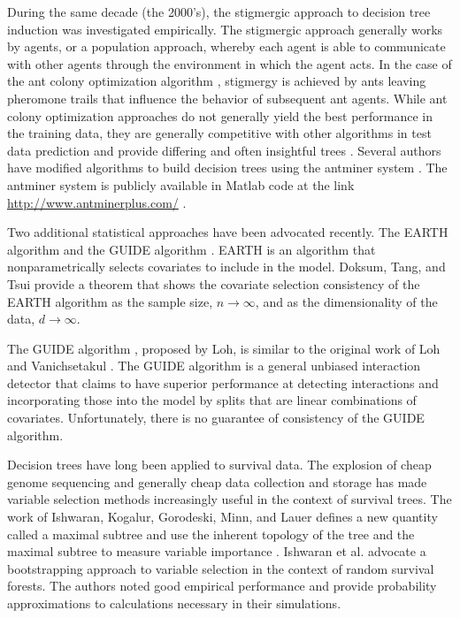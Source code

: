 During the same decade (the 2000's), the stigmergic approach to decision tree induction was investigated empirically. The stigmergic approach generally works by agents, or a population approach, whereby each agent is able to communicate with other agents through the environment in which the agent acts. In the case of the ant colony optimization algorithm \cite{dorigo2004ant}, stigmergy is achieved by ants leaving pheromone trails that influence the behavior of subsequent ant agents. While ant colony optimization approaches do not generally yield the best performance in the training data, they are generally competitive with other algorithms in test data prediction and provide differing and often insightful trees \cite{dorigo2006ant}. Several authors have modified algorithms to build decision trees using the antminer system\cite{parpinelli2002data} \cite{liu2003classification}. The antminer system is publicly available in Matlab code at the link \href{http://www.antminerplus.com/}{http://www.antminerplus.com/} .   

Two additional statistical approaches have been advocated recently. The EARTH algorithm and the GUIDE algorithm \cite{doksum2008nonparametric} \cite{guide}. EARTH is an algorithm that nonparametrically selects covariates to include in the model. Doksum, Tang, and Tsui provide a theorem that shows the covariate selection consistency of the EARTH algorithm as the sample size, $n\to\infty$, and as the dimensionality of the data, $d\to\infty$. %

The GUIDE algorithm \cite{guide}, proposed by Loh, is similar to the original work of Loh and Vanichsetakul \cite{loh1988tree}. The GUIDE algorithm is a general unbiased interaction detector that claims to have superior performance at detecting interactions and incorporating those into the model by splits that are linear combinations of covariates.  Unfortunately, there is no guarantee of consistency of the GUIDE algorithm.


Decision trees have long been applied to survival data. The explosion of cheap genome sequencing and generally cheap data collection and storage has made variable selection methods increasingly useful in the context of survival trees. The work of Ishwaran, Kogalur, Gorodeski, Minn, and Lauer defines a new quantity called a maximal subtree and use the inherent topology of the tree and the maximal subtree to measure variable importance  \cite{ishwaran2010high}. Ishwaran et al. advocate a bootstrapping approach to variable selection in the context of random survival forests. The authors noted good empirical performance and provide probability approximations to calculations necessary in their simulations. 

